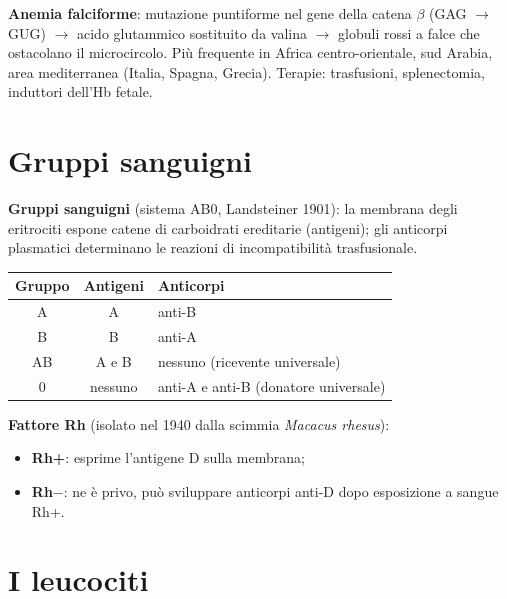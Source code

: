 \textbf{Anemia falciforme}: mutazione puntiforme nel gene della catena $\beta$ (GAG $\rightarrow$
GUG) $\rightarrow$ acido glutammico sostituito da valina $\rightarrow$ globuli rossi a falce che
ostacolano il microcircolo. Più frequente in Africa centro-orientale, sud Arabia, area mediterranea
(Italia, Spagna, Grecia). Terapie: trasfusioni, splenectomia, induttori dell'Hb fetale.

\section{Gruppi sanguigni}

\textbf{Gruppi sanguigni} (sistema AB0, Landsteiner 1901): la membrana degli eritrociti espone
catene di carboidrati ereditarie (antigeni); gli anticorpi plasmatici determinano le reazioni di
incompatibilità trasfusionale.
\begin{table}[htbp]
  \centering \small \renewcommand{\arraystretch}{1.2}
  \begin{tabular}{|c|c|l|}
    \hline
    \textbf{Gruppo} & \textbf{Antigeni} & \textbf{Anticorpi} \\
    \hline
    A  & A       & anti-B \\
    B  & B       & anti-A \\
    AB & A e B   & nessuno (ricevente universale) \\
    0  & nessuno & anti-A e anti-B (donatore universale) \\
    \hline
  \end{tabular}
\end{table}

\textbf{Fattore Rh} (isolato nel 1940 dalla scimmia \textit{Macacus rhesus}):
\begin{itemize}
  \item \textbf{Rh+}: esprime l'antigene D sulla membrana;
  \item \textbf{Rh$-$}: ne è privo, può sviluppare anticorpi anti-D dopo esposizione a sangue Rh+.
\end{itemize}

\section{I leucociti}

